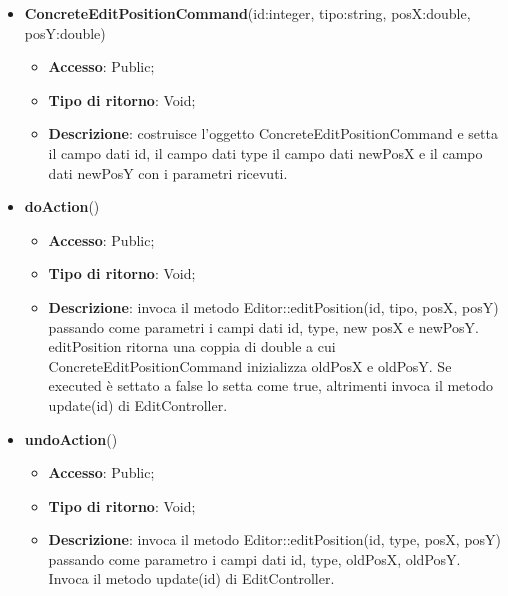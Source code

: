 {{{	
	\begin{itemize}
		\item \textbf{ConcreteEditPositionCommand}(id:integer, tipo:string, posX:double, posY:double)
		\begin{itemize}
			\item \textbf{Accesso}: Public;
			\item \textbf{Tipo di ritorno}: Void;
			\item \textbf{Descrizione}: costruisce l’oggetto ConcreteEditPositionCommand e setta il campo dati id, il campo dati type il campo dati newPosX e il campo dati newPosY con i parametri ricevuti.
		\end{itemize}
		\item \textbf{doAction}()
		\begin{itemize}
			\item \textbf{Accesso}: Public;
			\item \textbf{Tipo di ritorno}: Void;
			\item \textbf{Descrizione}: invoca il metodo Editor::editPosition(id, tipo, posX, posY) passando come parametri i campi dati id, type, new posX e newPosY. editPosition ritorna una coppia di double a cui ConcreteEditPositionCommand inizializza oldPosX e oldPosY. Se executed è settato a false lo setta come true, altrimenti invoca il metodo update(id) di EditController.
		\end{itemize}
		\item \textbf{undoAction}()
		\begin{itemize}
			\item \textbf{Accesso}: Public;
			\item \textbf{Tipo di ritorno}: Void;
			\item \textbf{Descrizione}: invoca il metodo Editor::editPosition(id, type, posX, posY) passando come parametro i campi dati id, type, oldPosX, oldPosY. Invoca il metodo update(id) di EditController.
		\end{itemize}
	\end{itemize}
	}
}}
